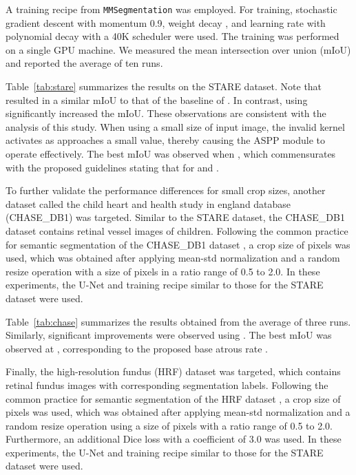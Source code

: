 \documentclass{article}
\def\tabref#1{Table~\ref{#1}}
\begin{document}
A training recipe from \texttt{MMSegmentation} \citep{mmseg2020} was employed. For training, stochastic gradient descent with momentum 0.9, weight decay , and learning rate  with polynomial decay with a 40K scheduler were used. The training was performed on a single GPU machine. We measured the mean intersection over union (mIoU) and reported the average of ten runs.

\tabref{tab:stare} summarizes the results on the STARE dataset. Note that  resulted in a similar mIoU to that of the baseline of . In contrast, using  significantly increased the mIoU. These observations are consistent with the analysis of this study. When using a small size of input image, the invalid kernel activates as  approaches a small value, thereby causing the ASPP module to operate effectively. The best mIoU was observed when , which commensurates with the proposed guidelines stating that  for  and .

To further validate the performance differences for small crop sizes, another dataset called the child heart and health study in england database (CHASE\_DB1) \citep{DBLP:journals/tbe/FrazRHUROB12} was targeted. Similar to the STARE dataset, the CHASE\_DB1 dataset contains retinal vessel images of children. Following the common practice for semantic segmentation of the CHASE\_DB1 dataset \citep{DBLP:journals/tbe/YanYC18}, a crop size of  pixels was used, which was obtained after applying mean-std normalization and a random resize operation with a size of  pixels in a ratio range of 0.5 to 2.0. In these experiments, the U-Net and training recipe similar to those for the STARE dataset were used.

\tabref{tab:chase} summarizes the results obtained from the average of three runs. Similarly, significant improvements were observed using . The best mIoU was observed at , corresponding to the proposed base atrous rate .

Finally, the high-resolution fundus (HRF) dataset \citep{DBLP:journals/ijbi/BudaiBMHM13} was targeted, which contains retinal fundus images with corresponding segmentation labels. Following the common practice for semantic segmentation of the HRF dataset \citep{DBLP:conf/midl/BreaJ0W20}, a crop size of  pixels was used, which was obtained after applying mean-std normalization and a random resize operation using a size of  pixels with a ratio range of 0.5 to 2.0. Furthermore, an additional Dice loss with a coefficient of 3.0 was used. In these experiments, the U-Net and training recipe similar to those for the STARE dataset were used.
\end{document}
